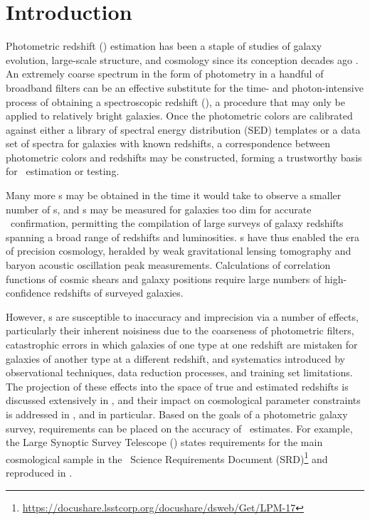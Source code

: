 \chapter*{Introduction}


Photometric redshift (\pz) estimation has been a staple of studies of galaxy evolution, large-scale structure, and cosmology since its conception decades ago \citep{Baum1962}.  
An extremely coarse spectrum in the form of photometry in a handful of broadband filters can be an effective substitute for the time- and photon-intensive process of obtaining a spectroscopic redshift (\sz), a procedure that may only be applied to relatively bright galaxies.  
Once the photometric colors are calibrated against either a library of spectral energy distribution (SED) templates or a data set of spectra for galaxies with known redshifts, a correspondence between photometric colors and redshifts may be constructed, forming a trustworthy basis for \pz\ estimation or testing.

Many more \pz s may be obtained in the time it would take to observe a smaller number of \sz s, and \pz s may be measured for galaxies too dim for accurate \sz\ confirmation, permitting the compilation of large surveys of galaxy redshifts spanning a broad range of redshifts and luminosities.  
\Pz s have thus enabled the era of precision cosmology, heralded by weak gravitational lensing tomography and baryon acoustic oscillation peak measurements.  
Calculations of correlation functions of cosmic shears and galaxy positions require large numbers of high-confidence redshifts of surveyed galaxies.  

However, \pz s are susceptible to inaccuracy and imprecision via a number of effects, particularly their inherent noisiness due to the coarseness of photometric filters, catastrophic errors in which galaxies of one type at one redshift are mistaken for galaxies of another type at a different redshift, and systematics introduced by observational techniques, data reduction processes, and training set limitations.  
The projection of these effects into the space of true and estimated redshifts is discussed extensively in , and their impact on cosmological parameter constraints is addressed in , and  in particular.
Based on the goals of a photometric galaxy survey, requirements can be placed on the accuracy of \pz\ estimates.
For example, the Large Synoptic Survey Telescope (\lsst) states requirements for the main cosmological sample in the \lsst\ Science Requirements Document (SRD)\footnote{\url{https://docushare.lsstcorp.org/docushare/dsweb/Get/LPM-17}} and reproduced in .

